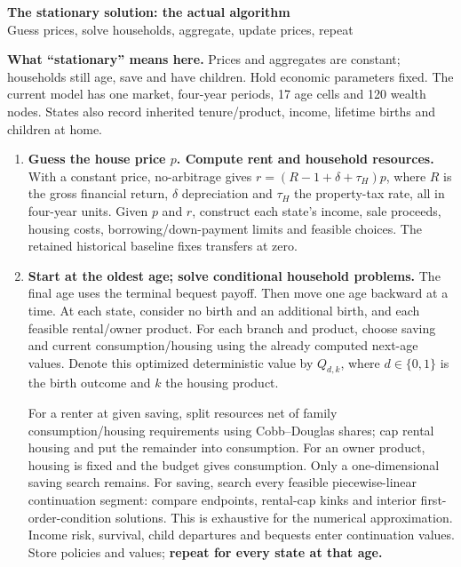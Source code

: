 \documentclass[10pt]{article}
\newcommand{\lead}[1]{\textbf{\color{ink}#1}}
\begin{document}
\begin{center}
{\Large\bfseries The stationary solution: the actual algorithm}\\[3pt]
{\small Guess prices, solve households, aggregate, update prices, repeat}
\end{center}

\lead{What ``stationary'' means here.} Prices and aggregates are constant; households still age, save and have children. Hold economic parameters fixed. The current model has one market, four-year periods, 17 age cells and 120 wealth nodes. States also record inherited tenure/product, income, lifetime births and children at home.

\begin{enumerate}
\item \lead{Guess the house price $p$. Compute rent and household resources.}
With a constant price, no-arbitrage gives $r=(R-1+\delta+\tau_H)p$, where $R$ is the gross financial return, $\delta$ depreciation and $\tau_H$ the property-tax rate, all in four-year units. Given $p$ and $r$, construct each state's income, sale proceeds, housing costs, borrowing/down-payment limits and feasible choices. The retained historical baseline fixes transfers at zero.

\item \lead{Start at the oldest age; solve conditional household problems.}
The final age uses the terminal bequest payoff. Then move one age backward at a time. At each state, consider no birth and an additional birth, and each feasible rental/owner product. For each branch and product, choose saving and current consumption/housing using the already computed next-age values. Denote this optimized deterministic value by $Q_{d,k}$, where $d\in\{0,1\}$ is the birth outcome and $k$ the housing product.

For a renter at given saving, split resources net of family consumption/housing requirements using Cobb--Douglas shares; cap rental housing and put the remainder into consumption. For an owner product, housing is fixed and the budget gives consumption. Only a one-dimensional saving search remains. For saving, search every feasible piecewise-linear continuation segment: compare endpoints, rental-cap kinks and interior first-order-condition solutions. This is exhaustive for the numerical approximation. Income risk, survival, child departures and bequests enter continuation values. Store policies and values; \textbf{repeat for every state at that age.}


\end{enumerate}
\end{document}
